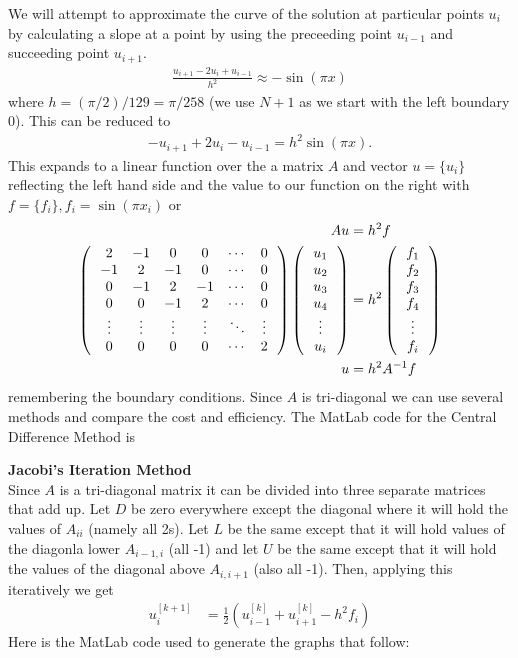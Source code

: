 \documentclass[10pt,a4paper]{report}
\begin{document}
We will attempt to approximate the curve of  the solution at particular points $u_i$ by calculating a slope at a point by using the preceeding point $u_{i-1}$ and succeeding point $u_{i+1}$.  
\begin{align*}
	\frac{u_{i+1}-2u_i+u_{i-1}}{h^2} \approx -\sin (\pi x)
\end{align*}where $h=(\pi/2)/129=\pi/258$ (we use $N+1$ as we start with the left boundary 0).  This can be reduced to 
\begin{align*}
	-u_{i+1}+2u_i-u_{i-1} = h^2\sin (\pi x).
\end{align*}This expands to a linear function over the a matrix $A$ and vector $u=\{ u_i \}$ reflecting the left hand side and the value to our function on the right with $f=\{ f_i \}, f_i=\sin(\pi x_i)$ or
\begin{align*}
	Au &= h^2 f\\
	\left (\, \begin{array}{cccccc}
		2 & -1 & 0 & 0 &\cdots & 0\\
		-1 & 2 & -1 & 0 &\cdots & 0\\
		0 & -1 & 2 & -1 &\cdots & 0\\
		0 & 0 &-1 & 2 & \cdots & 0\\
		\vdots & \vdots & \vdots & \vdots &\ddots & \vdots\\
		0 & 0 & 0 & 0 & \cdots & 2
	\end{array}  \,\right ) \left (\, \begin{array}{c}  u_1 \\ u_2 \\ u_3 \\ u_4 \\ \vdots \\ u_i  \end{array}  \,\right ) &= h^2 \left (\, \begin{array}{c}  f_1 \\ f_2 \\ f_3 \\ f_4 \\ \vdots \\ f_i  \end{array}  \,\right ) \\
	u &= h^2 A^{-1} f
\end{align*}remembering the boundary conditions.  Since $A$ is tri-diagonal we can use several methods and compare the cost and efficiency.  The MatLab code for the Central Difference Method is
	

\noindent\textbf{Jacobi's Iteration Method}\\

Since $A$ is a tri-diagonal matrix it can be divided into three separate matrices that add up.  Let $D$ be zero everywhere except the diagonal where it will hold the values of $A_{ii}$ (namely all 2s).  Let $L$ be the same except that it will hold values of the diagonla lower $A_{i-1,i}$ (all -1) and let $U$ be the same except that it will hold the values of the diagonal above $A_{i,i+1}$ (also all -1).  Then, applying this iteratively we get
\begin{align*}
	u_i^{[k+1]} &= \frac{1}{2}(u_{i-1}^{[k]}+u_{i+1}^{[k]} - h^2 f_i)
\end{align*}Here is the MatLab code used to generate the graphs that follow:
	
	
\end{document}
